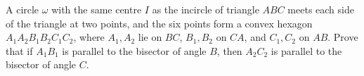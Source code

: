 A circle $\omega$ with the same centre $I$ as the incircle of triangle $ABC$ meets each side of the triangle at two points, and the six points form a convex hexagon $A_1A_2B_1B_2C_1C_2$, where $A_1,A_2$ lie on $BC$, $B_1,B_2$ on $CA$, and $C_1,C_2$ on $AB$. Prove that if $A_1B_1$ is parallel to the bisector of angle $B$, then $A_2C_2$ is parallel to the bisector of angle $C$.
